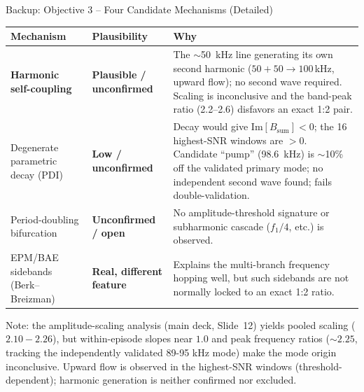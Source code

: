 \documentclass[aspectratio=169]{beamer}
\begin{document}
\begin{frame}{Backup: Objective 3 -- Four Candidate Mechanisms (Detailed)}
    \scriptsize
    \renewcommand{\arraystretch}{1.15}
    \setlength{\tabcolsep}{4pt}
    \begin{tabularx}{\textwidth}{@{}p{3.0cm}p{2.6cm}X@{}}
        \toprule
        \textbf{Mechanism} & \textbf{Plausibility} & \textbf{Why} \\
        \midrule
        \textbf{Harmonic self-coupling} & 
        \textcolor{orange!70!black}{\textbf{Plausible / unconfirmed}} &
        The $\sim$\SI{50}{kHz} line generating its own second harmonic
        ($50+50\to100$\,kHz, upward flow); no second wave required. Scaling is
        inconclusive and the band-peak ratio (2.2--2.6) disfavors an exact 1:2 pair. \\
        \addlinespace
        Degenerate parametric decay (PDI) &
        \textcolor{orange!80!black}{\textbf{Low / unconfirmed}} &
        Decay would give $\mathrm{Im}[B_{\text{sum}}]<0$; the 16 highest-SNR
        windows are $>0$. Candidate ``pump'' (\SI{98.6}{kHz}) is $\sim$10\% off
        the validated primary mode; no independent second wave found; fails
        double-validation. \\
        \addlinespace
        Period-doubling bifurcation &
        \textcolor{orange!80!black}{\textbf{Unconfirmed / open}} &
        No amplitude-threshold signature or subharmonic cascade ($f_1/4$, etc.)
        is observed. \\
        \addlinespace
        EPM/BAE sidebands (Berk--Breizman) &
        \textcolor{green!50!black}{\textbf{Real, different feature}} &
        Explains the multi-branch frequency hopping well, but such sidebands
        are not normally locked to an exact 1:2 ratio. \\
        \bottomrule
    \end{tabularx}
    \vspace{0.2cm}
    \normalsize
    Note: the amplitude-scaling analysis (main deck, Slide~12) yields
    pooled scaling ($2.10{-}2.26$), but within-episode slopes near $1.0$ and peak
    frequency ratios (${\sim}2.25$, tracking the independently validated 89-95 kHz mode) 
    make the mode origin inconclusive. Upward flow is observed in the highest-SNR windows (threshold-dependent); harmonic generation is neither confirmed nor excluded.
\end{frame}
\end{document}
